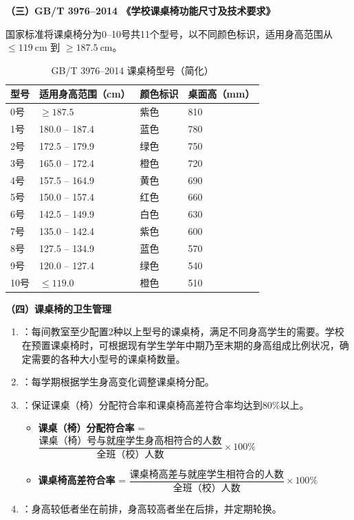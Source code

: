 \begin{keybox}
\textbf{（三）GB/T 3976--2014 《学校课桌椅功能尺寸及技术要求》}

国家标准将课桌椅分为0--10号共11个型号，以不同颜色标识，适用身高范围从 $\leq 119\ \mathrm{cm}$ 到 $\geq 187.5\ \mathrm{cm}$。

\begin{table}[H]
\centering
\caption{GB/T 3976--2014 课桌椅型号（简化）}
\begin{tabularx}{\textwidth}{llXl}
\hline
\textbf{型号} & \textbf{适用身高范围（cm）} & \textbf{颜色标识} & \textbf{桌面高（mm）} \\
\hline
0号  & $\geq 187.5$ & 紫色 & 810 \\
1号  & 180.0 -- 187.4 & 蓝色 & 780 \\
2号  & 172.5 -- 179.9 & 绿色 & 750 \\
3号  & 165.0 -- 172.4 & 橙色 & 720 \\
4号  & 157.5 -- 164.9 & 黄色 & 690 \\
5号  & 150.0 -- 157.4 & 红色 & 660 \\
6号  & 142.5 -- 149.9 & 白色 & 630 \\
7号  & 135.0 -- 142.4 & 紫色 & 600 \\
8号  & 127.5 -- 134.9 & 蓝色 & 570 \\
9号  & 120.0 -- 127.4 & 绿色 & 540 \\
10号 & $\leq 119.0$ & 橙色 & 510 \\
\hline
\end{tabularx}
\end{table}

\textbf{（四）课桌椅的卫生管理}

\begin{enumerate}[leftmargin=*]
    \item {}：每间教室至少配置2种以上型号的课桌椅，满足不同身高学生的需要。学校在预置课桌椅时，可根据现有学生学年中期乃至末期的身高组成比例状况，确定需要的各种大小型号的课桌椅数量。

    \item {}：每学期根据学生身高变化调整课桌椅分配。

    \item {}：保证课桌（椅）分配符合率和课桌椅高差符合率均达到80\%以上。
    \begin{itemize}
        \item \textbf{课桌（椅）分配符合率} = $\dfrac{\text{课桌（椅）号与就座学生身高相符合的人数}}{\text{全班（校）人数}} \times 100\%$
        \item \textbf{课桌椅高差符合率} = $\dfrac{\text{课桌椅高差与就座学生相符合的人数}}{\text{全班（校）人数}} \times 100\%$
    \end{itemize}

    \item {}：身高较低者坐在前排，身高较高者坐在后排，并定期轮换。
\end{enumerate}
\end{keybox}

